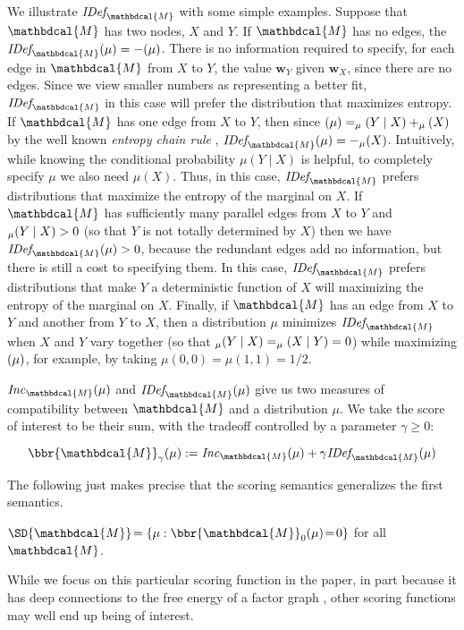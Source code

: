 \documentclass[letterpaper]{article} %
\theoremstyle{plain}
\theoremstyle{definition}
\theoremstyle{remark}
\newcommand{\begthm}[3][]{\begin{#2}[{name=#1},restate=#3,label=#3]}
\let\H\relax
\DeclareMathOperator{\H}{\mathrm{H}} %
\newcommand\mat[1]{\mathbf{#1}}
\newcommand{\dg}[1]{\mathbdcal{#1}}
\newcommand{\IDef}[1]{\mathit{IDef}_{\!#1}}
\newcommand\Inc{\mathit{Inc}}
\begin{document}
We illustrate $\IDef{\dg M}$ with some simple examples.  
Suppose that $\dg M$ has two nodes, $X$ and $Y$.  If $\dg M$ has no edges, the
$\IDef{\dg M}(\mu) = - \H(\mu)$. There is no information required to specify, for
each edge in ${\dg M}$ from $X$ to $Y$, the value ${\mat w}_Y$ given ${\mat
w}_X$, since there are no edges. Since we view smaller numbers as representing a
better fit, $\IDef{\dg M}$ in this case will prefer the distribution that
maximizes entropy. If $\dg M$ has one edge from $X$ to $Y$, then since $\H(\mu) =
\H_{\mu}(Y \mid X) + \H_\mu(X)$
by the well known \emph{entropy chain rule} \cite{mackay2003information},
$\IDef{\dg   M}(\mu) = -\H_{\mu}(X)$. Intuitively,
while knowing the conditional probability $\mu(Y \mid X)$ is helpful, to
completely specify $\mu$ we also need $\mu(X)$. Thus, in this case, $\IDef{\dg
M}$ prefers distributions that maximize the entropy of the marginal
on $X$. 
If $\dg M$ has sufficiently many parallel edges
 from $X$ to $Y$
 and $\H_{\mu}(Y \mid X) > 0$ 
(so that $Y$ is not totally determined by $X$)
then we have $\IDef{\dg M}(\mu) > 0$, because the redundant edges add no
information, but there is still a cost to specifying them.
In this case, $\IDef{\dg M}$ prefers distributions that make $Y$ a
deterministic function of $X$ will maximizing the entropy of the
marginal on $X$.
Finally, if ${\dg M}$ has an edge from $X$ to $Y$ and another from $Y$
to $X$, then a distribution $\mu$ minimizes $\IDef{\dg M}$ when 
$X$ and $Y$  vary together (so that $\H_\mu(Y \mid X) = \H_\mu(X \mid Y) = 0$)
while maximizing $\H(\mu)$, for example, by taking $\mu(0,0)
= \mu(1,1) = 1/2$. 


$\Inc_{\dg M}(\mu)$ and $\IDef{\dg M}(\mu)$ give us two measures
of compatibility between ${\dg M}$ and a distribution $\mu$.
We take the score of interest to be their sum, with the tradeoff
controlled by a parameter $\gamma \ge 0$:

\begin{equation}
  	  \bbr{\dg M}_\gamma(\mu)
	 := \Inc_{\dg M}(\mu) + \gamma \IDef{\dg M}(\mu)  \label{eqn:full-score}
\end{equation}

The following just makes precise that the scoring semantics generalizes the first semantics.

\begthm{prop}{prop:sd-is-zeroset}
	$\SD{\dg M} \!= \{ \mu : \bbr{\dg M}_0(\mu) \!=\! 0\}$ for 
	all $\dg M$.
\end{prop}
          
While we focus on this particular scoring function in the paper, 
in part because
it has deep connections to the free energy of a factor graph \cite{KF09},
other scoring functions may well end up being of interest. 
        
\end{document}
